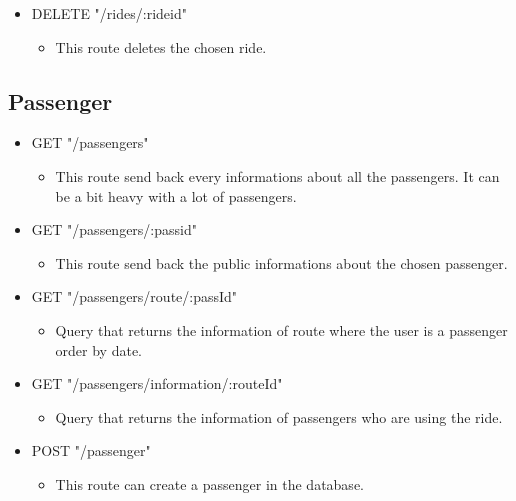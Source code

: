 \begin{itemize}
	\item  DELETE "/rides/:rideid"
	\begin{itemize}
		\item This route deletes the chosen ride.
	\end{itemize}
\end{itemize}

\subsection{Passenger}
\begin{itemize}
	\item GET "/passengers"
	\begin{itemize}
		\item This route send back every informations about all the passengers. It can be a bit heavy with a lot of passengers.
	\end{itemize}
\end{itemize}

\begin{itemize}
	\item GET "/passengers/:passid"
	\begin{itemize}
		\item This route send back the public informations about the chosen passenger.

	\end{itemize}
\end{itemize}

\begin{itemize}
	\item GET "/passengers/route/:passId"
	\begin{itemize}
		\item Query that returns the information of route where the user is a passenger order by date.
	\end{itemize}
\end{itemize}

\begin{itemize}
	\item GET "/passengers/information/:routeId"
	\begin{itemize}
		\item Query that returns the information of passengers who are using the ride.
	\end{itemize}
\end{itemize}

\begin{itemize}
	\item POST "/passenger"
	\begin{itemize}
		\item 	This route can create a passenger in the database.
	\end{itemize}
\end{itemize}

